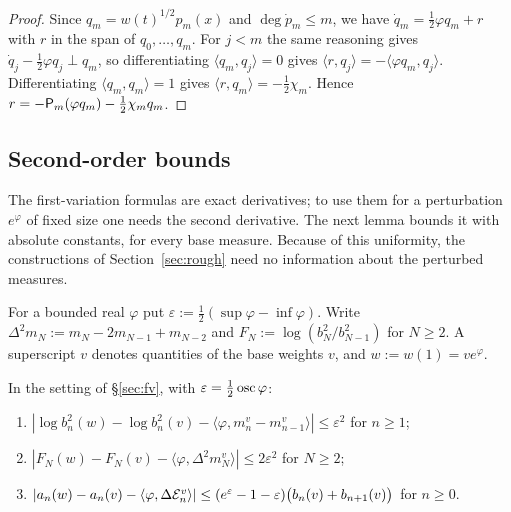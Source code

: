 \begin{proof}
Since $q_m=w(t)^{1/2}p_m(x)$ and $\deg\dot p_m\le m$, we have $\dot q_m=\frac12\varphi q_m+r$ with $r$ in the span of
$q_0,\dots,q_m$. For $j<m$ the same reasoning gives $\dot q_j-\frac12\varphi q_j\perp q_m$, so differentiating
$\langle q_m,q_j\rangle=0$ gives $\langle r,q_j\rangle=-\langle\varphi q_m,q_j\rangle$. Differentiating
$\langle q_m,q_m\rangle=1$ gives $\langle r,q_m\rangle=-\frac12\chi_m$. Hence $r=-\mathsf{P}_m(\varphi q_m)-\frac12\chi_mq_m$.
\end{proof}

\subsection{Second-order bounds}\label{sec:lr}
The first-variation formulas are exact derivatives; to use them for a perturbation $e^\varphi$ of fixed size one
needs the second derivative. The next lemma bounds it with absolute constants, for every base measure. Because of this uniformity, the
constructions of Section~\ref{sec:rough} need no information about the perturbed measures.

For a bounded real $\varphi$ put $\varepsilon:=\frac12(\sup\varphi-\inf\varphi)$. Write
$\Delta^2m_N:=m_N-2m_{N-1}+m_{N-2}$ and $F_N:=\log(b_N^2/b_{N-1}^2)$ for $N\ge2$. A superscript $v$ denotes quantities
of the base weights $v$, and $w:=w(1)=ve^\varphi$.

\begin{lemma}\label{lem:lr}
In the setting of \S\ref{sec:fv}, with $\varepsilon=\frac12\operatorname{osc}\varphi$:
\begin{enumerate}
\item[\textup{(i)}] $|\log b_n^2(w)-\log b_n^2(v)-\langle\varphi,m_n^v-m_{n-1}^v\rangle|\le\varepsilon^2$ for $n\ge1$;
\item[\textup{(ii)}] $|F_N(w)-F_N(v)-\langle\varphi,\Delta^2m_N^v\rangle|\le2\varepsilon^2$ for $N\ge2$;
\item[\textup{(iii)}] $|a_n(w)-a_n(v)-\langle\varphi,\Delta\mathcal{E}_n^v\rangle|\le(e^\varepsilon-1-\varepsilon)
  \bigl(b_n(v)+b_{n+1}(v)\bigr)$ for $n\ge0$.
\end{enumerate}
\end{lemma}

